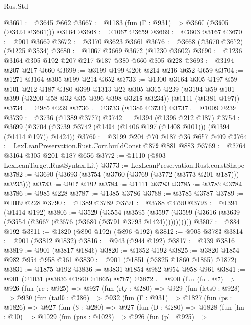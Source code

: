 \begin{lexlean}{RustStd}
\begin{coremodule}
{\begin{coremodule}
{{{{{{{{{{{{{{@3661 := @3645 @662
@3667 := @1183 (fun (Γ : @931) => @3660 (@3605 (@3624 @3661))) @3164
@3668 := @1067 @3659
@3669 := @3603 @3167
@3670 := @901 @3669
@3672 := @3170 @3623 @3661
@3676 := @3668 (@3670 @3672) (@1225 @3534)
@3680 := @1067 @3669 @3672 (@1230 @3602)
@3690 := @1236 @3164 @305 @192 @207 @217 @187 @380 @660 @305 @228
@3693 := @3194 @207 @217 @660
@3699 := @3199 @199 @206 @214 @216 @652 @659
@3704 := @1271 @3164 @305 @199 @214 @652
@3733 := @1300
    @3164
    @305
    @197
    @59
    @101
    @212
    @187
    @380
    @399
    @1313
    @23
    @305
    @305
    @239
    (@3194 @59 @101 @399 (@3200 @58 @32 @35 @396 @398 @3216 @3234))
    (@1111 (@1381 @197))
@3734 := @985 @239
@3736 := @3733 (@1385 @3734)
@3737 := @1009 @239
@3739 := @3736 (@1389 @3737)
@3742 := @1394 (@1396 @212 @187)
@3754 := @3699 (@3704 (@3739 @3742 (@1404 (@1406 @197 (@1408 @101))) (@1394 (@1414 @197)) @1424))
@3760 := @3199 @204 @70 @187 @36 @657 @409
@3764 := LexLeanPreservation.Rust.Corr.buildConst @879 @881 @883
@3769 := @3764 @3164 @305 @201 @187 @656
@3772 := @1110 (@903 LexLeanTarget.RustSyntax.Lit)
@3773 := LexLeanPreservation.Rust.constShape
@3782 := @3690 (@3693 (@3754 (@3760 (@3769 (@3772 (@3773 @201 @187))) @3235)))
@3783 := @915 @192
@3784 := @1111 @3783
@3785 := @3782 @3784
@3786 := @985 @228
@3787 := @1385 @3786
@3788 := @3785 @3787
@3789 := @1009 @228
@3790 := @1389 @3789
@3791 := @3788 @3790
@3793 := @1394 (@1414 @192)
@3806 := @3529
    (@3554
      (@3595 (@3597 (@3599 (@3616 (@3639 (@3654 (@3667 (@3676 (@3680 (@3791 @3793 @1424)))))))))))
@3807 := @884 @192
@3811 := @1820 (@890 @192) (@896 @192)
@3812 := @905 @3783
@3814 := @901 (@3812 @1832)
@3816 := @943 (@944 @192)
@3817 := @939 @3816
@3819 := @901 (@3817 @1846)
@3820 := @1852 @192
@3825 := @3820 @1854 @982 @954 @958 @961
@3830 := @901 (@1851 (@3825 @1860 @1865) @1872)
@3831 := @1875 @192
@3836 := @3831 @1854 @982 @954 @958 @961
@3841 := @901 (@1031 (@3836 @1860 @1865) @787)
@3872 := @900
    (fun (fn : @7) =>
    @926
      (fun (rc : @925) =>
      @927
        (fun (rty : @280) =>
        @929
          (fun (lets0 : @928) =>
          @930
            (fun (tail0 : @386) =>
            @932
              (fun (Γ : @931) =>
              @1827
                (fun (ps : @1826) =>
                @927
                  (fun (S : @280) =>
                  @927
                    (fun (D : @280) =>
                    @1828
                      (fun (hn : @10) =>
                      @1029
                        (fun (pns : @1028) =>
                        @926
                          (fun (pl : @925) =>
}}}}}}}}}}}}}}
\end{coremodule}}
\end{coremodule}
\end{lexlean}
